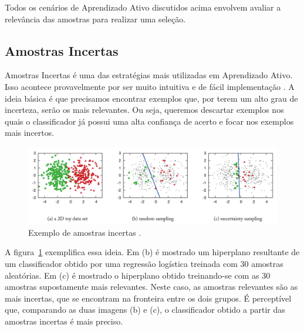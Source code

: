 Todos os cenários de Aprendizado Ativo discutidos acima envolvem avaliar a relevância das amostras para realizar uma seleção. 




\subsection{Amostras Incertas} %
\label{sec:amostras_incertas}

Amostras Incertas é uma das estratégias mais utilizadas em Aprendizado Ativo. Isso acontece provavelmente por ser muito intuitiva e de fácil implementação \citep{settles2014active}. A ideia básica é que precisamos encontrar exemplos que, por terem um alto grau de incerteza, serão os mais relevantes. Ou seja, queremos descartar exemplos nos quais o classificador já possui uma alta confiança de acerto e focar nos exemplos mais incertos.  


\begin{figure}
  \centering
  \includegraphics[width=1.0\textwidth]{figures/settles_2014_uncertainty_sampling_example.png}
  \caption{Exemplo de amostras incertas \citep{settles2014active}.}
  \label{fig:settles_2014_uncertainty_example}
\end{figure}

A figura~\ref{fig:settles_2014_uncertainty_example} exemplifica essa ideia. Em (b) é mostrado um hiperplano resultante de um classificador obtido por uma regressão logística treinada com 30 amostras aleatórias. Em (c) é mostrado o hiperplano obtido treinando-se com as 30 amostras supostamente mais relevantes. Neste caso, as amostras relevantes são as mais incertas, que se encontram na fronteira entre os dois grupos. É perceptível que, comparando as duas imagens (b) e (c), o classificador obtido a partir das amostras incertas é mais preciso.%

